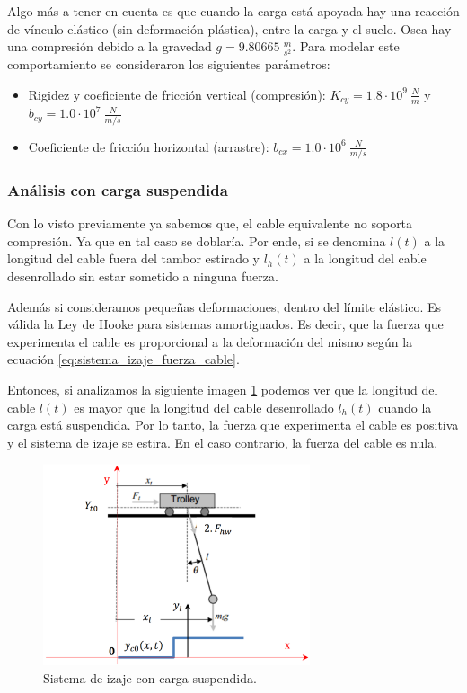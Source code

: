 \documentclass[11pt]{article}
\begin{document}
Algo más a tener en cuenta es que cuando la carga está apoyada hay una reacción de vínculo elástico (sin deformación plástica), entre la carga y el suelo. Osea hay una compresión debido a la gravedad $g=9.80665\ \frac{m}{s^{2}}$. Para modelar este comportamiento se consideraron los siguientes parámetros:
\begin{itemize}
	\item Rigidez y coeficiente de fricción vertical (compresión): $K_{cy}=1.8\cdot 10^{9}\ \frac{N}{m}$ y $b_{cy}=1.0\cdot 10^{7}\ \frac{N}{m/s}$
	\item Coeficiente de fricción horizontal (arrastre): $b_{cx}=1.0\cdot 10^{6}\ \frac{N}{m/s}$
\end{itemize}

\subsubsection{Análisis con carga suspendida}

Con lo visto previamente ya sabemos que, el cable equivalente no soporta compresión. Ya que en tal caso se doblaría. Por ende, si se denomina $l(t)$ a la longitud del cable fuera del tambor estirado y $l_{h}(t)$ a la longitud del cable desenrollado sin estar sometido a ninguna fuerza.

Además si consideramos pequeñas deformaciones, dentro del límite elástico. Es válida la Ley de Hooke para sistemas amortiguados. Es decir, que la fuerza que experimenta el cable es proporcional a la deformación del mismo según la ecuación \ref{eq:sistema_izaje_fuerza_cable}.

Entonces, si analizamos la siguiente imagen \ref{fig:sistema_pendulo} podemos ver que la longitud del cable $l(t)$ es mayor que la longitud del cable desenrollado $l_{h}(t)$ cuando la carga está suspendida. Por lo tanto, la fuerza que experimenta el cable es positiva y el sistema de izaje se estira. En el caso contrario, la fuerza del cable es nula.

\begin{figure}[h!]
	\centering
	\includegraphics[width=0.7\textwidth]{images/imagen_7_sistema_pendulo.png}
	\caption{Sistema de izaje con carga suspendida.}
	\label{fig:sistema_pendulo}
\end{figure}
\end{document}
